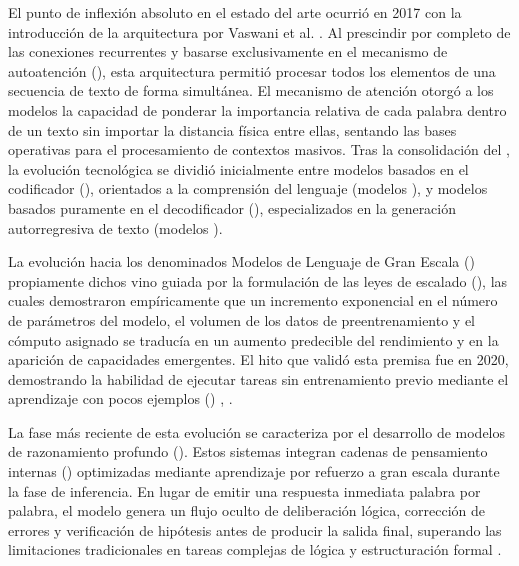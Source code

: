 El punto de inflexión absoluto en el estado del arte ocurrió en 2017 con la introducción de la arquitectura
 por Vaswani et al. . Al prescindir por completo de las 
conexiones recurrentes y basarse exclusivamente en el mecanismo de autoatención (), 
esta arquitectura permitió procesar todos los elementos de una secuencia de texto de forma simultánea. 
El mecanismo de atención otorgó a los modelos la capacidad de ponderar la importancia relativa de cada 
palabra dentro de un texto sin importar la distancia física entre ellas, sentando las bases operativas para el 
procesamiento de contextos masivos.
Tras la consolidación del , la evolución tecnológica se dividió inicialmente entre modelos 
basados en el codificador (), orientados a la comprensión del lenguaje (modelos ),
y modelos basados puramente en el decodificador (), especializados en la generación 
autorregresiva de texto (modelos ).

La evolución hacia los denominados Modelos de Lenguaje de Gran Escala () propiamente dichos vino 
guiada por la formulación de las leyes de escalado (), las cuales demostraron empíricamente 
que un incremento exponencial en el número de parámetros del modelo, el volumen de los datos de preentrenamiento y el 
cómputo asignado se traducía en un aumento predecible del rendimiento y en la aparición de capacidades emergentes. 
El hito que validó esta premisa fue  en 2020, demostrando la habilidad de ejecutar tareas sin 
entrenamiento previo mediante el aprendizaje con pocos ejemplos () , 
. 

La fase más reciente de esta evolución se caracteriza por el desarrollo de modelos de razonamiento profundo 
(). 
Estos sistemas integran cadenas de pensamiento internas () optimizadas mediante 
aprendizaje por refuerzo a gran escala durante la fase de inferencia. En lugar de emitir una respuesta inmediata 
palabra por palabra, el modelo genera un flujo oculto de deliberación lógica, corrección de errores y verificación
de hipótesis antes de producir la salida final, superando las limitaciones tradicionales en tareas complejas de lógica
y estructuración formal .

